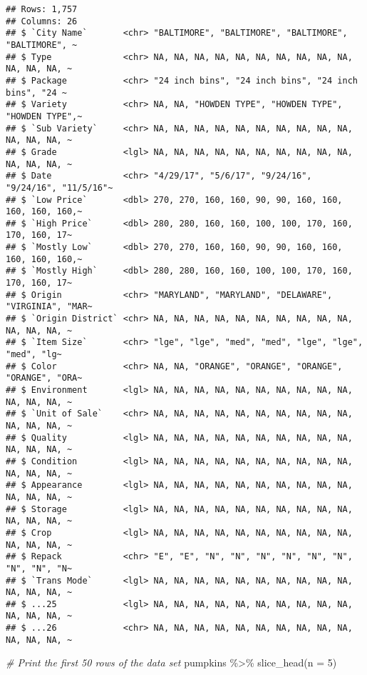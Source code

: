 \documentclass[
]{article}
\newenvironment{Shaded}{\begin{snugshade}}{\end{snugshade}}
\newcommand{\AttributeTok}[1]{\textcolor[rgb]{0.77,0.63,0.00}{#1}}
\newcommand{\CommentTok}[1]{\textcolor[rgb]{0.56,0.35,0.01}{\textit{#1}}}
\newcommand{\DecValTok}[1]{\textcolor[rgb]{0.00,0.00,0.81}{#1}}
\newcommand{\FunctionTok}[1]{\textcolor[rgb]{0.00,0.00,0.00}{#1}}
\newcommand{\NormalTok}[1]{#1}
\newcommand{\SpecialCharTok}[1]{\textcolor[rgb]{0.00,0.00,0.00}{#1}}
\begin{document}
\begin{verbatim}
## Rows: 1,757
## Columns: 26
## $ `City Name`       <chr> "BALTIMORE", "BALTIMORE", "BALTIMORE", "BALTIMORE", ~
## $ Type              <chr> NA, NA, NA, NA, NA, NA, NA, NA, NA, NA, NA, NA, NA, ~
## $ Package           <chr> "24 inch bins", "24 inch bins", "24 inch bins", "24 ~
## $ Variety           <chr> NA, NA, "HOWDEN TYPE", "HOWDEN TYPE", "HOWDEN TYPE",~
## $ `Sub Variety`     <chr> NA, NA, NA, NA, NA, NA, NA, NA, NA, NA, NA, NA, NA, ~
## $ Grade             <lgl> NA, NA, NA, NA, NA, NA, NA, NA, NA, NA, NA, NA, NA, ~
## $ Date              <chr> "4/29/17", "5/6/17", "9/24/16", "9/24/16", "11/5/16"~
## $ `Low Price`       <dbl> 270, 270, 160, 160, 90, 90, 160, 160, 160, 160, 160,~
## $ `High Price`      <dbl> 280, 280, 160, 160, 100, 100, 170, 160, 170, 160, 17~
## $ `Mostly Low`      <dbl> 270, 270, 160, 160, 90, 90, 160, 160, 160, 160, 160,~
## $ `Mostly High`     <dbl> 280, 280, 160, 160, 100, 100, 170, 160, 170, 160, 17~
## $ Origin            <chr> "MARYLAND", "MARYLAND", "DELAWARE", "VIRGINIA", "MAR~
## $ `Origin District` <chr> NA, NA, NA, NA, NA, NA, NA, NA, NA, NA, NA, NA, NA, ~
## $ `Item Size`       <chr> "lge", "lge", "med", "med", "lge", "lge", "med", "lg~
## $ Color             <chr> NA, NA, "ORANGE", "ORANGE", "ORANGE", "ORANGE", "ORA~
## $ Environment       <lgl> NA, NA, NA, NA, NA, NA, NA, NA, NA, NA, NA, NA, NA, ~
## $ `Unit of Sale`    <chr> NA, NA, NA, NA, NA, NA, NA, NA, NA, NA, NA, NA, NA, ~
## $ Quality           <lgl> NA, NA, NA, NA, NA, NA, NA, NA, NA, NA, NA, NA, NA, ~
## $ Condition         <lgl> NA, NA, NA, NA, NA, NA, NA, NA, NA, NA, NA, NA, NA, ~
## $ Appearance        <lgl> NA, NA, NA, NA, NA, NA, NA, NA, NA, NA, NA, NA, NA, ~
## $ Storage           <lgl> NA, NA, NA, NA, NA, NA, NA, NA, NA, NA, NA, NA, NA, ~
## $ Crop              <lgl> NA, NA, NA, NA, NA, NA, NA, NA, NA, NA, NA, NA, NA, ~
## $ Repack            <chr> "E", "E", "N", "N", "N", "N", "N", "N", "N", "N", "N~
## $ `Trans Mode`      <lgl> NA, NA, NA, NA, NA, NA, NA, NA, NA, NA, NA, NA, NA, ~
## $ ...25             <lgl> NA, NA, NA, NA, NA, NA, NA, NA, NA, NA, NA, NA, NA, ~
## $ ...26             <chr> NA, NA, NA, NA, NA, NA, NA, NA, NA, NA, NA, NA, NA, ~
\end{verbatim}

\begin{Shaded}
\begin{Highlighting}[]
\CommentTok{\# Print the first 50 rows of the data set}
\NormalTok{pumpkins }\SpecialCharTok{\%\textgreater{}\%} 
  \FunctionTok{slice\_head}\NormalTok{(}\AttributeTok{n =} \DecValTok{5}\NormalTok{)}
\end{Highlighting}
\end{Shaded}
\end{document}
